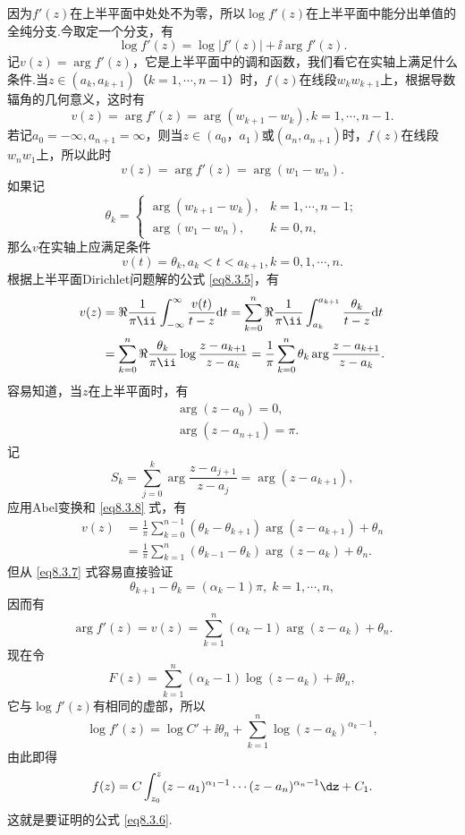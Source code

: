 因为$f'(z)$在上半平面中处处不为零，所以$\log f'(z)$在上半平面中能分出单值的全纯分支.今取定一个分支，有
\[\log f'(z)=\log|f'(z)|+\ii\arg f'(z).\]
记$v(z)=\arg f'(z)$，它是上半平面中的调和函数，我们看它在实轴上满足什么条件.当$z\in(a_k,a_{k+1})$（$k=1,\cdots,n-1$）时，$f(z)$在线段$w_kw_{k+1}$上，根据导数辐角的几何意义，这时有
\[v(z)=\arg f'(z)=\arg (w_{k+1}-w_k),k=1,\cdots,n-1.\]
若记$a_0=-\infty,a_{n+1}=\infty$，则当$z\in(a_0，a_1)$或$(a_n,a_{n+1})$时，$f(z)$在线段$w_nw_1$上，所以此时
\[v(z)=\arg f'(z)=\arg(w_1-w_n).\]
如果记
\begin{equation}\label{eq8.3.7}
\theta_k=\begin{cases}
\arg(w_{k+1}-w_k),&k=1,\cdots,n-1;\\
\arg(w_1-w_n),&k=0,n,
\end{cases}
\end{equation}
那么$v$在实轴上应满足条件
\[v(t)=\theta_k,a_k<t<a_{k+1},k=0,1,\cdots,n.\]
根据上半平面Dirichlet问题解的公式 \eqref{eq8.3.5}，有
\begin{align*}
v(z)&=\Re\frac1{\pi\ii}\int_{-\infty}^\infty\frac{v(t)}{t-z}\textrm dt
=\sum_{k=0}^n\Re\frac1{\pi\ii}\int_{a_k}^{a_{k+1}}\frac{\theta_k}{t-z}\textrm dt\\
&=\sum_{k=0}^n\Re\frac{\theta_k}{\pi\ii}\log\frac{z-a_{k+1}}{z-a_k}
=\frac1\pi\sum_{k=0}^n\theta_k\arg\frac{z-a_{k+1}}{z-a_k}.
\end{align*}
容易知道，当$z$在上半平面时，有
\begin{equation}\label{eq8.3.8}
\begin{aligned}
&\arg(z-a_0)=0,\\
&\arg(z-a_{n+1})=\pi.
\end{aligned}
\end{equation}
记
\[S_k=\sum_{j=0}^k\arg\frac{z-a_{j+1}}{z-a_j}=\arg(z-a_{k+1}),\]
应用Abel变换和 \eqref{eq8.3.8} 式，有
\begin{align*}
v(z)&=\frac1\pi\sum_{k=0}^{n-1}(\theta_k-\theta_{k+1})\arg(z-a_{k+1})+\theta_n\\
&=\frac1\pi\sum_{k=1}^n(\theta_{k-1}-\theta_k)\arg(z-a_k)+\theta_n.
\end{align*}
但从 \eqref{eq8.3.7} 式容易直接验证
\[\theta_{k+1}-\theta_k=(\alpha_k-1)\pi,\;k=1,\cdots,n,\]
因而有
\[\arg f'(z)=v(z)=\sum_{k=1}^n(\alpha_k-1)\arg(z-a_k)+\theta_n.\]
现在令
\[F(z)=\sum_{k=1}^n(\alpha_k-1)\log(z-a_k)+\ii\theta_n,\]
它与$\log f'(z)$有相同的虚部，所以
\[\log f'(z)=\log C'+\ii\theta_n+\sum_{k=1}^n\log(z-a_k)^{\alpha_k-1},\]
由此即得
\begin{equation*}
f(z)=C\int_{z_0}^z(z-a_1)^{\alpha_1-1}\cdots(z-a_n)^{\alpha_n-1}\dz+C_1.
\end{equation*}
这就是要证明的公式 \eqref{eq8.3.6}.

